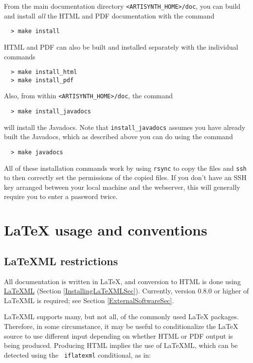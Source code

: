 \documentclass{article}
\begin{document}
From the main documentation directory {\tt <ARTISYNTH\_HOME>/doc}, you
can build and install {\it all} the HTML and PDF documentation with
the command
%
\begin{verbatim}
  > make install
\end{verbatim}
%
HTML and PDF can also be built and installed separately with the
individual commands
%
\begin {verbatim}
  > make install_html
  > make install_pdf
\end{verbatim}
%
Also, from within {\tt <ARTISYNTH\_HOME>/doc}, the command
%
\begin{verbatim}
  > make install_javadocs
\end{verbatim}
%
will install the Javadocs. Note that {\tt install\_javadocs} assumes
you have already built the Javadocs, which as described above you can
do using the command
%
\begin{verbatim}
  > make javadocs
\end{verbatim}
%
\begin{sideblock}
All of these installation commands work by using {\tt rsync}
to copy the files and
{\tt ssh} to then correctly set the permissions of the copied files.
If you don't have an SSH key arranged between your local machine
and the webserver, this will generally require 
you to enter a password twice.
\end{sideblock}

\section{LaTeX usage and conventions}

\label{LatexUsage}

\subsection{LaTeXML restrictions}

All documentation is written in LaTeX, and conversion to HTML is done
using \href{http://dlmf.nist.gov/LaTeXML/}{LaTeXML} (Section
\ref{InstallingLaTeXMLSec}).  Currently, version 0.8.0 or higher of
LaTeXML is required; see Section \ref{ExternalSoftwareSec}.

LaTeXML supports many, but not all, of the commonly used LaTeX
packages. Therefore, in some circumstance, it may be useful to
conditionalize the LaTeX source to use different input depending on
whether HTML or PDF output is being produced. Producing HTML implies
the use of LaTeXML, which can be detected using the {\tt \BKS
iflatexml} conditional, as in:
\end{document}
